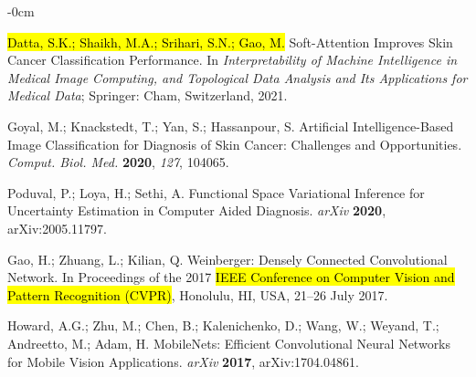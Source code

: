 \documentclass[sensors,article,accept,pdftex,moreauthors]{Definitions/mdpi}
\begin{document}
	\begin{adjustwidth}{-\extralength}{0cm}
		
		
		
		
		\begin{thebibliography}{999}

\hl{Datta, S.K.; Shaikh, M.A.; Srihari, S.N.; Gao, M.}%
 Soft-Attention Improves Skin Cancer Classification Performance. In \emph{Interpretability of Machine Intelligence in Medical Image Computing, and Topological Data Analysis and Its Applications for Medical Data}; Springer: Cham, Switzerland, 
{2021}.

Goyal, M.; Knackstedt, T.; Yan, S.; Hassanpour, S.  Artificial Intelligence-Based Image Classification for Diagnosis of Skin Cancer: Challenges and Opportunities. 
{\em Comput. Biol. Med.} 
{\bf 2020}, \emph{127}, 104065.

Poduval, P.; Loya, H.; Sethi, A. Functional Space Variational Inference for Uncertainty Estimation in Computer Aided Diagnosis. 
{\em arXiv} 
{\bf 2020}, arXiv:2005.11797.

{Gao, H.; Zhuang, L.; Kilian, Q.  Weinberger: Densely Connected Convolutional Network.} In Proceedings of the 2017 \hl{IEEE Conference on Computer Vision and Pattern Recognition (CVPR)}, Honolulu, HI, USA, 21--26 July 2017.

Howard, A.G.; Zhu, M.; Chen, B.; Kalenichenko, D.; Wang, W.;  Weyand, T.;  Andreetto, M.; Adam, H. MobileNets: Efficient Convolutional Neural Networks for Mobile Vision Applications.
{\em arXiv} 
{\bf 2017}, arXiv:1704.04861.


\end{thebibliography}
\end{adjustwidth}
\end{document}
